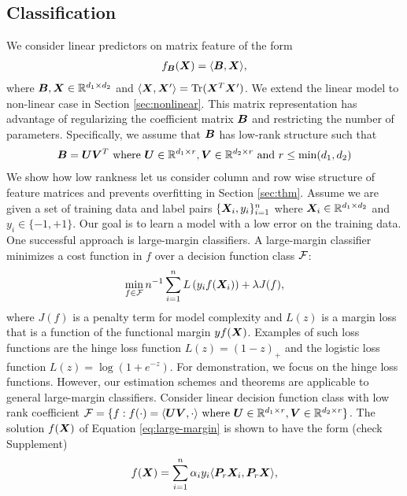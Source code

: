 \documentclass[12pt]{article}
\begin{document}
\subsection{Classification}
We consider linear predictors on matrix feature of the form 
\begin{align}
f_{\bm B}(\bm X) = \langle \bm B,\bm X\rangle,
\end{align}
where $\bm B,\bm X\in\mathbb{R}^{d_1\times d_2}$ and $\langle \bm X,\bm X'\rangle = \text{Tr}(\bm X^T\bm X')$. We extend the linear model to non-linear case in Section \ref{sec:nonlinear}.
This matrix representation has advantage of regularizing the coefficient matrix $\bm B$ and restricting the number of parameters. Specifically, we assume that $\bm B$ has low-rank structure such that
\begin{align}
\bm B = \bm{U}\bm{V}^T \text{ where } \bm{U} \in\mathbb{R}^{d_1\times r} ,\bm{V}\in\mathbb{R}^{d_2\times r}\text{ and } r\leq\min(d_1,d_2)
\end{align}
We show how low rankness let us consider column and row wise structure of feature matrices and prevents overfitting in Section  \ref{sec:thm}.
Assume we are given a set of training data and label pairs $\{\bm X_i,y_i\}_{i=1}^n$ where $\bm X_i\in\mathbb{R}^{d_1\times d_2}$ and $y_i\in\{-1,+1\}$. Our goal is to learn a model with a low error on the training data. One successful approach is  large-margin classifiers.
A large-margin classifier minimizes a cost function in $f$ over a decision function class $\mathcal{F}$:
\begin{align}
\label{eq:large-margin}
\min_{f\in\mathcal{F}}n^{-1}\sum_{i=1}^n L\left(y_i f(\bm X_i)\right)+\lambda J(f),
\end{align}
where $J(f)$ is a penalty term for model complexity and $L(z)$ is a margin loss that is a function of the functional margin $yf(\bm X)$. Examples of such loss functions are the hinge loss function $L(z) = (1-z)_+$ and the logistic loss function $L(z) =\log(1+e^{-z})$.  
For demonstration, we focus on the hinge loss functions. However, our estimation schemes and theorems are applicable to general large-margin classifiers. Consider linear decision function class with low rank coefficient  $\mathcal{F} = \{f: f(\cdot) = \langle \bm{U}\bm{V},\cdot\rangle \text{ where }\bm{U}\in\mathbb{R}^{d_1\times r},\bm{V}\in\mathbb{R}^{d_2\times r}\}$.
The solution $f(\bm X)$ of Equation \eqref{eq:large-margin}  is shown to have the form  (check Supplement)
\begin{align}\label{eq:form}
f(\bm X) = \sum_{i=1}^n \alpha_i y_i\langle \bm{P}_r\bm X_i, \bm{P}_r \bm X\rangle,
\end{align}
\end{document}
